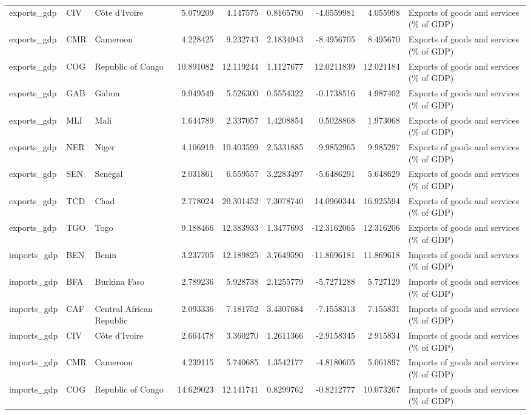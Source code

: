 \begin{table}
\begin{tabular}[t]{lllrrrrrl}
exports\_gdp & CIV & Côte d'Ivoire & 5.079209 & 4.147575 & 0.8165790 & -4.0559981 & 4.055998 & Exports of goods and services (\% of GDP)\\
\addlinespace
exports\_gdp & CMR & Cameroon & 4.228425 & 9.232743 & 2.1834943 & -8.4956705 & 8.495670 & Exports of goods and services (\% of GDP)\\
exports\_gdp & COG & Republic of Congo & 10.891082 & 12.119244 & 1.1127677 & 12.0211839 & 12.021184 & Exports of goods and services (\% of GDP)\\
exports\_gdp & GAB & Gabon & 9.949549 & 5.526300 & 0.5554322 & -0.1738516 & 4.987402 & Exports of goods and services (\% of GDP)\\
exports\_gdp & MLI & Mali & 1.644789 & 2.337057 & 1.4208854 & 0.5028868 & 1.973068 & Exports of goods and services (\% of GDP)\\
exports\_gdp & NER & Niger & 4.106919 & 10.403599 & 2.5331885 & -9.9852965 & 9.985297 & Exports of goods and services (\% of GDP)\\
\addlinespace
exports\_gdp & SEN & Senegal & 2.031861 & 6.559557 & 3.2283497 & -5.6486291 & 5.648629 & Exports of goods and services (\% of GDP)\\
exports\_gdp & TCD & Chad & 2.778024 & 20.301452 & 7.3078740 & 14.0960344 & 16.925594 & Exports of goods and services (\% of GDP)\\
exports\_gdp & TGO & Togo & 9.188466 & 12.383933 & 1.3477693 & -12.3162065 & 12.316206 & Exports of goods and services (\% of GDP)\\
imports\_gdp & BEN & Benin & 3.237705 & 12.189825 & 3.7649590 & -11.8696181 & 11.869618 & Imports of goods and services (\% of GDP)\\
imports\_gdp & BFA & Burkina Faso & 2.789236 & 5.928738 & 2.1255779 & -5.7271288 & 5.727129 & Imports of goods and services (\% of GDP)\\
\addlinespace
imports\_gdp & CAF & Central African Republic & 2.093336 & 7.181752 & 3.4307684 & -7.1558313 & 7.155831 & Imports of goods and services (\% of GDP)\\
imports\_gdp & CIV & Côte d'Ivoire & 2.664478 & 3.360270 & 1.2611366 & -2.9158345 & 2.915834 & Imports of goods and services (\% of GDP)\\
imports\_gdp & CMR & Cameroon & 4.239115 & 5.740685 & 1.3542177 & -4.8180605 & 5.061897 & Imports of goods and services (\% of GDP)\\
imports\_gdp & COG & Republic of Congo & 14.629023 & 12.141741 & 0.8299762 & -0.8212777 & 10.073267 & Imports of goods and services (\% of GDP)\\

\end{tabular}
\end{table}
